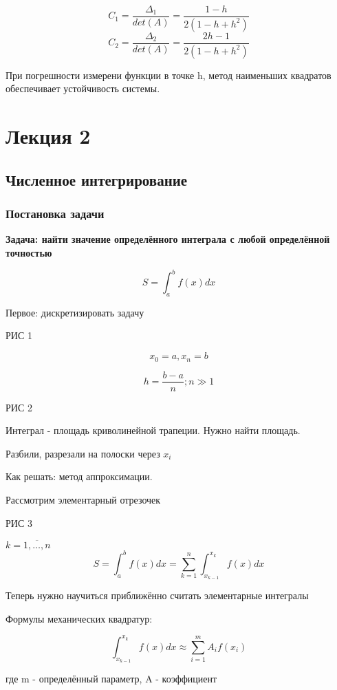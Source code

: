 \documentclass[12pt]{article}
\begin{document}
\[ C_1 = \frac{\Delta_1}{det(A)} = \frac{1 - h}{2 (1 - h + h^2)} \] 
\[ C_2 = \frac{\Delta_2}{det(A)} = \frac{2 h - 1}{2 (1 - h + h^2)} \] 

При погрешности измерени функции в точке h, метод наименьших квадратов
обеспечивает устойчивость системы.

\newpage

\section{Лекция 2}
\subsection{Численное интегрирование}
\subsubsection{Постановка задачи}
\textbf{Задача: найти значение определённого интеграла с любой определённой точностью}

\[
  S = \int_a^b f(x)dx
\] 

Первое: дискретизировать задачу

РИС 1

\[
  x_0 = a, x_n = b
\] 

\[
  h = \frac{b - a}{n}; n \gg 1
\]

РИС 2

Интеграл - площадь криволинейной трапеции. Нужно найти площадь.

Разбили, разрезали на полоски через \( x_i \)


Как решать: метод аппроксимации.

Рассмотрим элементарный отрезочек

РИС 3

\( k = \overline{1,\dots,n} \)
\[
  S = \int_{a}^{b} f(x)dx = \sum_{k=1}^{n} \int_{x_{k-1}}^{x_k} f(x)dx
\] 

Теперь нужно научиться приближённо считать элементарные интегралы

Формулы механических квадратур:

\[
  \int_{x_{k-1}}^{x_k} f(x)dx \approx \sum_{i=1}^m A_i f(x_i)
\] 

где m - определённый параметр,
A - коэффициент

\end{document}
